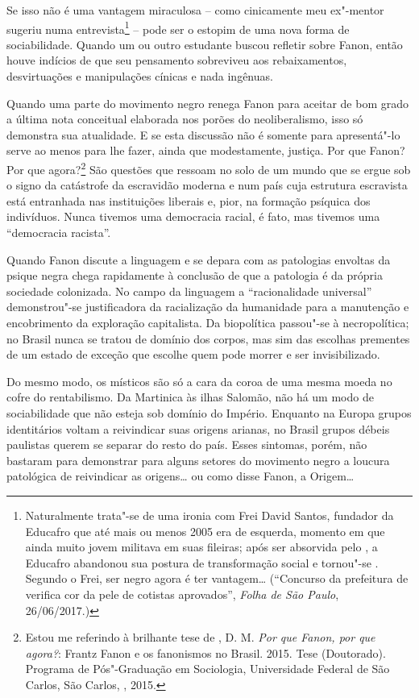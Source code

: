 Se isso não é uma vantagem miraculosa -- como cinicamente meu ex"-mentor
sugeriu numa entrevista\footnote{Naturalmente trata"-se de uma ironia com
  Frei David Santos, fundador da Educafro que até mais ou menos 2005 era
  de esquerda, momento em que ainda muito jovem militava em suas
  fileiras; após ser absorvida pelo , a Educafro abandonou sua postura
  de transformação social e tornou"-se . Segundo o Frei, ser negro
  agora é ter vantagem\ldots{} (``Concurso da prefeitura de  verifica cor da
      pele de cotistas aprovados'', \emph{Folha de São Paulo}, 26/06/2017.)}
-- pode ser o estopim de uma nova forma de sociabilidade. Quando um ou
outro estudante buscou refletir sobre Fanon, então houve indícios de que
seu pensamento sobreviveu aos rebaixamentos, desvirtuações e
manipulações cínicas e nada ingênuas.

Quando uma parte do movimento negro renega Fanon para aceitar de bom
grado a última nota conceitual elaborada nos porões do neoliberalismo,
isso só demonstra sua atualidade. E se esta discussão não é somente para
apresentá"-lo serve ao menos para lhe fazer, ainda que modestamente,
justiça. Por que Fanon? Por que agora?\footnote{Estou me referindo à
  brilhante tese de , D. M. \emph{Por que Fanon, por que
  agora?}: Frantz Fanon e os fanonismos no Brasil. 2015. Tese
  (Doutorado). Programa de Pós"-Graduação em Sociologia, Universidade
  Federal de São Carlos, São Carlos, , 2015.} São questões que ressoam
no solo de um mundo que se ergue sob o signo da catástrofe da escravidão
moderna e num país cuja estrutura escravista está entranhada nas
instituições liberais e, pior, na formação psíquica dos indivíduos.
Nunca tivemos uma democracia racial, é fato, mas tivemos uma
``democracia racista''.

Quando Fanon discute a linguagem e se depara com as patologias envoltas
da psique negra chega rapidamente à conclusão de que a patologia é da
própria sociedade colonizada. No campo da linguagem a ``racionalidade
universal'' demonstrou"-se justificadora da racialização da humanidade
para a manutenção e encobrimento da exploração capitalista. Da
biopolítica passou"-se à necropolítica; no Brasil nunca se tratou de
domínio dos corpos, mas sim das escolhas prementes de um estado de
exceção que escolhe quem pode morrer e ser invisibilizado.

Do mesmo modo, os místicos são só a cara da coroa de uma mesma moeda no
cofre do rentabilismo. Da Martinica às ilhas Salomão, não há um modo de
sociabilidade que não esteja sob domínio do Império. Enquanto na Europa
grupos identitários voltam a reivindicar suas origens arianas, no Brasil
grupos débeis paulistas querem se separar do resto do país. Esses
sintomas, porém, não bastaram para demonstrar para alguns setores do
movimento negro a loucura patológica de reivindicar as origens\ldots{} ou
como disse Fanon, a Origem\ldots{}

